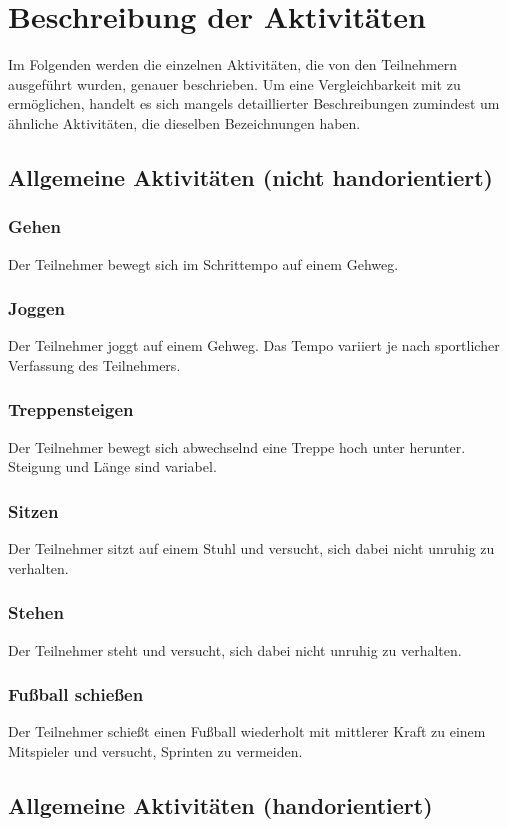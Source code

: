 \section{Beschreibung der Aktivitäten}
\label{sec:activities}
Im Folgenden werden die einzelnen Aktivitäten, die von den Teilnehmern ausgeführt wurden, genauer beschrieben. Um eine Vergleichbarkeit mit \cite{Weiss2016} zu ermöglichen, handelt es sich mangels detaillierter Beschreibungen zumindest um ähnliche Aktivitäten, die dieselben Bezeichnungen haben.

\subsection{Allgemeine Aktivitäten (nicht handorientiert)}
\subsubsection{Gehen}
Der Teilnehmer bewegt sich im Schrittempo auf einem Gehweg.
\subsubsection{Joggen}
Der Teilnehmer joggt auf einem Gehweg. Das Tempo variiert je nach sportlicher Verfassung des Teilnehmers.
\subsubsection{Treppensteigen}
Der Teilnehmer bewegt sich abwechselnd eine Treppe hoch unter herunter. Steigung und Länge sind variabel.
\subsubsection{Sitzen}
Der Teilnehmer sitzt auf einem Stuhl und versucht, sich dabei nicht unruhig zu verhalten.
\subsubsection{Stehen}
Der Teilnehmer steht und versucht, sich dabei nicht unruhig zu verhalten.
\subsubsection{Fußball schießen}
Der Teilnehmer schießt einen Fußball wiederholt mit mittlerer Kraft zu einem Mitspieler und versucht, Sprinten zu vermeiden.

\subsection{Allgemeine Aktivitäten (handorientiert)}
